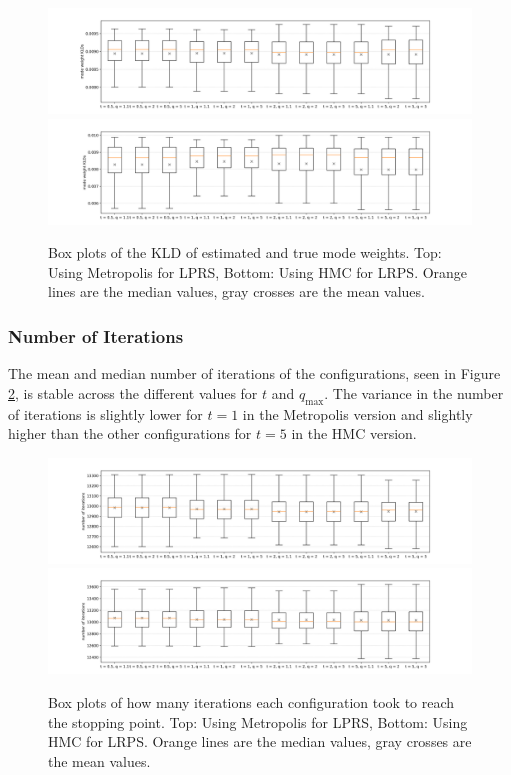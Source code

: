 \documentclass[12pt, a4paper]{report}
\begin{document}
\begin{figure}
    \centering
    \includegraphics[trim={3cm 0cm 3cm 0cm}, clip, width=\textwidth]{figs/results/params/KLDs_metropolis.png}
    \includegraphics[trim={3cm 0cm 3cm 0cm}, clip, width=\textwidth]{figs/results/params/KLDs_hmc.png}
    \caption{Box plots of the KLD of estimated and true mode weights. Top: Using Metropolis for LPRS, Bottom: Using HMC for LRPS. Orange lines are the median values, gray crosses are the mean values.}
    \label{fig:results_params_KLDs}
\end{figure}

\subsubsection{Number of Iterations} %
The mean and median number of iterations of the configurations, seen in Figure \ref{fig:results_params_iterations}, is stable across the different values for $t$ and $q_{\textrm{max}}$.
The variance in the number of iterations is slightly lower for $t=1$ in the Metropolis version and slightly higher than the other configurations for $t=5$ in the HMC version.
\begin{figure}
    \centering
    \includegraphics[trim={3cm 0cm 3cm 0cm}, clip, width=\textwidth]{figs/results/params/iterations_metropolis.png}
    \includegraphics[trim={3cm 0cm 3cm 0cm}, clip, width=\textwidth]{figs/results/params/iterations_hmc.png}
    \caption{Box plots of how many iterations each configuration took to reach the stopping point. Top: Using Metropolis for LPRS, Bottom: Using HMC for LRPS. Orange lines are the median values, gray crosses are the mean values.}
    \label{fig:results_params_iterations}
\end{figure}
\end{document}
